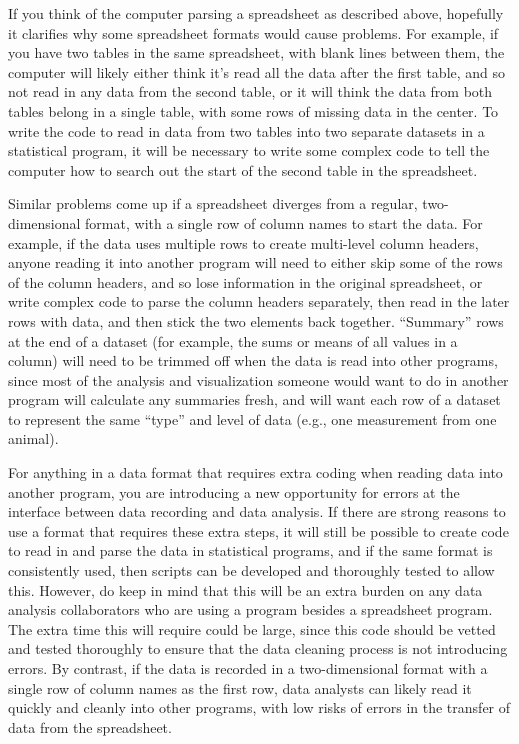 \documentclass[]{tufte-book}
\begin{document}
If you think of the computer parsing a spreadsheet as described above, hopefully
it clarifies why some spreadsheet formats would cause problems. For example, if
you have two tables in the same spreadsheet, with blank lines between them, the
computer will likely either think it's read all the data after the first table,
and so not read in any data from the second table, or it will think the data
from both tables belong in a single table, with some rows of missing data in the
center. To write the code to read in data from two tables into two separate
datasets in a statistical program, it will be necessary to write some complex
code to tell the computer how to search out the start of the second table in the
spreadsheet.

Similar problems come up if a spreadsheet diverges from a regular,
two-dimensional format, with a single row of column names to start the data.
For example, if the data uses multiple rows to create multi-level
column headers, anyone reading it into another program will need to
either skip some of the rows of the column headers, and so lose information
in the original spreadsheet, or write complex code to parse the column
headers separately, then read in the later rows with data, and then stick
the two elements back together. ``Summary'' rows at the end of a dataset
(for example, the sums or means of all values in a column) will need to
be trimmed off when the data is read into other programs, since most
of the analysis and visualization someone would want to do in another
program will calculate any summaries fresh, and will want each row of
a dataset to represent the same ``type'' and level of data (e.g., one measurement
from one animal).

For anything in a data format that requires extra coding when reading data into
another program, you are introducing a new opportunity for errors at the
interface between data recording and data analysis. If there are strong reasons
to use a format that requires these extra steps, it will still be possible to
create code to read in and parse the data in statistical programs, and if the
same format is consistently used, then scripts can be developed and thoroughly
tested to allow this. However, do keep in mind that this will be an extra
burden on any data analysis collaborators who are using a program besides a
spreadsheet program. The extra time this will require could be large, since
this code should be vetted and tested thoroughly to ensure that the data
cleaning process is not introducing errors. By contrast, if the data is
recorded in a two-dimensional format with a single row of column names as
the first row, data analysts can likely read it quickly and cleanly into
other programs, with low risks of errors in the transfer of data from the
spreadsheet.
\end{document}
